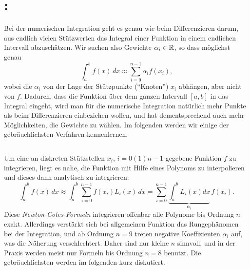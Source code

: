 \afterpage{\raggedbottom
  
  \clearpage
}

\section{: }

Bei der numerischen Integration geht es genau wie beim Differenzieren
darum, aus endlich vielen Stützwerten das Integral einer Funktion in
einem endlichen Intervall abzuschätzen. Wir suchen also Gewichte
$\alpha_{i}\in\mathbb{R}$, so dass möglichst genau
\begin{equation}
  \int_a^b f(x)\, dx \approx \sum_{i=0}^{n-1} \alpha_if(x_i),
\end{equation}
wobei die $\alpha_i$ von der Lage der Stützpunkte ("`Knoten"') $x_i$
abhängen, aber nicht von $f$. Dadurch, dass die Funktion über dem
ganzen Intervall $[a,b]$ in das Integral eingeht, wird man für die
numerische Integration natürlich mehr Punkte als beim Differenzieren
einbeziehen wollen, und hat dementsprechend auch mehr Möglichkeiten,
die Gewichte zu wählen. Im folgenden werden wir einige der
gebräuchlichsten Verfahren kennenlernen.

\subsection{}

Um eine an diskreten Stützstellen $x_i$, $i=0(1)n-1$ gegebene Funktion
$f$ zu integrieren, liegt es nahe, die Funktion mit Hilfe eines
Polynoms zu interpolieren und dieses dann analytisch zu integrieren:
\begin{equation}
  \int_a^b f(x)\, dx \approx
  \int_a^b \sum_{i=0}^{n-1} f(x_i) L_i(x) \, dx = \sum_{i=0}^{n-1}
  \underbrace{\int_a^b
  L_i(x) dx}_{\alpha_i}\, f(x_i).
\end{equation}
Diese \emph{Newton-Cotes-Formeln} integrieren offenbar alle Polynome
bis Ordnung $n$ exakt. Allerdings verstärkt sich bei allgemeinen
Funktion das Rungephänomen bei der Integration, und ab Ordnung $n=9$
treten negative Koeffizienten $\alpha_i$ auf, was die Näherung
verschlechtert. Daher sind nur kleine $n$ sinnvoll, und in der Praxis
werden meist nur Formeln bis Ordnung $n=8$ benutzt. Die
gebräuchlichsten werden im folgenden kurz diskutiert.

